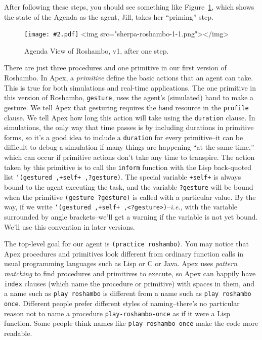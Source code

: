 \documentclass[12pt]{article}
\newcommand{\ic}{\texttt}
\newcommand{\firstref}{\textit}
\newenvironment{float}%
   {\begin{center}}%
   {\end{center}
   }
\newcommand{\img}[2]
 {\texonly \texttt{[image: \#2.pdf]} \endtexonly
  \htmlonly \rawhtml <img src="#2.png"></img>\endrawhtml \endhtmlonly}
\begin{document}
\noindent After following these steps, you should see something like Figure~\ref{fig.roshambo.1.1}, which shows the state of the Agenda as the agent, Jill, takes her ``priming'' step.

\begin{figure}
\begin{float}
\centerline {
\img{6in}{sherpa-roshambo-1-1}
}
\end{float}
\caption{Agenda View of Roshambo, v1, after one step.\label{fig.roshambo.1.1}}
\end{figure}

There are just three procedures and one primitive in our first version of Roshambo. In Apex, a \firstref{primitive} define the basic actions that an agent can take. This is true for both simulations and real-time applications. The one primitive in this version of Roshambo, \ic{gesture}, uses the agent's (simulated) hand to make a gesture. We tell Apex that gesturing requires the \ic{hand} resource in the \ic{profile} clause. We tell Apex how long this action will take using the \ic{duration} clause. In simulations, the only way that time passes is by including durations in primitive forms, so it's a good idea to include a \ic{duration} for every primitive--it can be difficult to debug a simulation if many things are happening ``at the same time,'' which can occur if primitive actions don't take any time to transpire. The action taken by this primitive is to call the \ic{inform} function with the Lisp back-quoted list \ic{`(gestured ,+self+ ,?gesture)}. The special variable \ic{+self+} is always bound to the agent executing the task, and the variable \ic{?gesture} will be bound when the primitive \ic{(gesture ?gesture)} is called with a particular value. By the way, if we write \ic{`(gestured ,+self+ ,<?gesture>)}--\textit{i.e.}, with the variable surrounded by angle brackets--we'll get a warning if the variable is not yet bound. We'll use this convention in later versions.

The top-level goal for our agent is \ic{(practice roshambo)}. You may notice that Apex procedures and primitives look different from ordinary function calls in usual programming languages such as Lisp or C or Java. Apex uses \firstref{pattern matching} to find procedures and primitives to execute, so Apex can happily have \ic{index} clauses (which name the procedure or primitive) with spaces in them, and a name such as \ic{play roshambo} is different from a name such as \ic{play roshambo once}. Different people prefer different styles of naming--there's no particular reason not to name a procedure \ic{play-roshambo-once} as if it were a Lisp function. Some people think names like \ic{play roshambo once} make the code more readable. 
\end{document}

